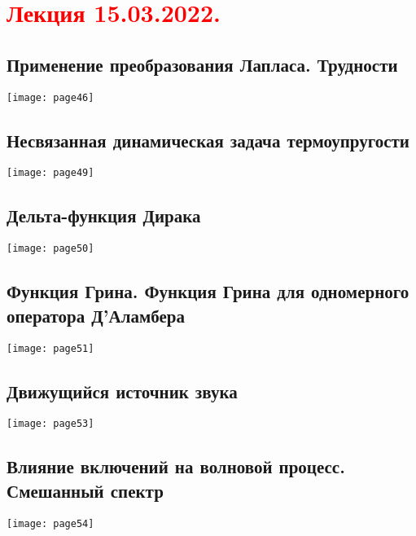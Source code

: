 \documentclass[main.tex]{subfiles}
\begin{document}
\section{\textcolor{red}{Лекция 15.03.2022.}}

\subsection{Применение преобразования Лапласа. Трудности}
\texttt{[image: page46]}



\subsection{Несвязанная динамическая задача термоупругости}
\texttt{[image: page49]}

\subsection{Дельта-функция Дирака}
\texttt{[image: page50]}

\subsection{Функция Грина. Функция Грина для одномерного оператора Д'Аламбера}
\texttt{[image: page51]}


\subsection{Движущийся источник звука}
\texttt{[image: page53]}

\subsection{Влияние включений на волновой процесс. Смешанный спектр}
\texttt{[image: page54]}



\end{document}
